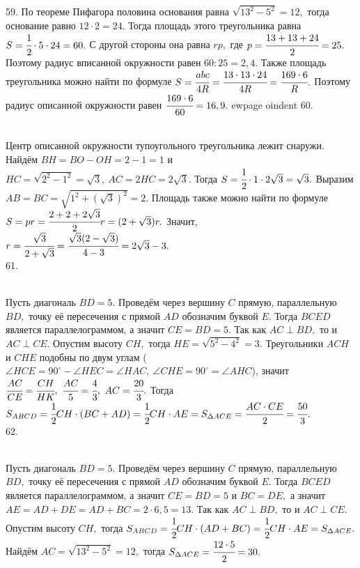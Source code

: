 59. По теореме Пифагора половина основания равна $\sqrt{13^2-5^2}=12,$ тогда основание равно $12\cdot2=24.$ Тогда площадь этого треугольника равна $S=\cfrac{1}{2}\cdot5\cdot24=60.$ С другой стороны она равна $rp,$ где $p=\cfrac{13+13+24}{2}=25.$ Поэтому радиус вписанной окружности равен $60:25=2,4.$ Также площадь треугольника можно найти по формуле $S=\cfrac{abc}{4R}=\cfrac{13\cdot13\cdot24}{4R}=\cfrac{169\cdot6}{R}.$ Поэтому радиус описанной окружности равен $\cfrac{169\cdot6}{60}=16,9.$
ewpage
oindent
60. \begin{figure}[ht!]
\end{figure}\\
Центр описанной окружности тупоугольного треугольника лежит снаружи. Найдём $BH=BO-OH=2-1=1$ и $HC=\sqrt{2^2-1^2}=\sqrt{3},\ AC=2HC=2\sqrt{3}.$ Тогда $S=\cfrac{1}{2}\cdot1\cdot2\sqrt{3}=\sqrt{3}.$ Выразим $AB=BC=\sqrt{1^2+(\sqrt{3})^2}=2.$ Площадь также можно найти по формуле $S=pr=\cfrac{2+2+2\sqrt{3}}{2}r=(2+\sqrt{3})r.$ Значит, $r=\cfrac{\sqrt{3}}{2+\sqrt{3}}=\cfrac{\sqrt{3}(2-\sqrt{3})}{4-3}=2\sqrt{3}-3.$\\
61. \begin{figure}[ht!]
\end{figure}\\
Пусть диагональ $BD=5.$ Проведём через вершину $C$ прямую, параллельную $BD,$ точку её пересечения с прямой $AD$ обозначим буквой $E.$ Тогда $BCED$ является параллелограммом, а значит $CE=BD=5.$ Так как $AC\perp BD,$ то и $AC\perp CE.$ Опустим высоту $CH,$ тогда $HE=\sqrt{5^2-4^2}=3.$ Треугольники $ACH$ и $CHE$ подобны по двум углам ($\angle HCE=90^\circ-\angle HEC=\angle HAC,\ \angle CHE=90^\circ=\angle AHC$), значит $\cfrac{AC}{CE}=\cfrac{CH}{HK},\ \cfrac{AC}{5}=\cfrac{4}{3},\ AC=\cfrac{20}{3}.$ Тогда $S_{ABCD}=\cfrac{1}{2}CH\cdot(BC+AD)=\cfrac{1}{2}CH\cdot AE=S_{\Delta ACE}=\cfrac{AC\cdot CE}{2}=\cfrac{50}{3}.$\\
62. \begin{figure}[ht!]
\end{figure}\\
Пусть диагональ $BD=5.$ Проведём через вершину $C$ прямую, параллельную $BD,$ точку её пересечения с прямой $AD$ обозначим буквой $E.$ Тогда $BCED$ является параллелограммом, а значит $CE=BD=5$ и $BC=DE,$ а значит $AE=AD+DE=AD+BC=2\cdot6,5=13.$ Так как $AC\perp BD,$ то и $AC\perp CE.$
Опустим высоту $CH,$ тогда $S_{ABCD}=\cfrac{1}{2} CH\cdot (AD+BC)=\cfrac{1}{2} CH\cdot AE=S_{\Delta ACE}.$ Найдём $AC=\sqrt{13^2-5^2}=12,$ тогда $S_{\Delta ACE}=\cfrac{12\cdot5}{2}=30.$\\
